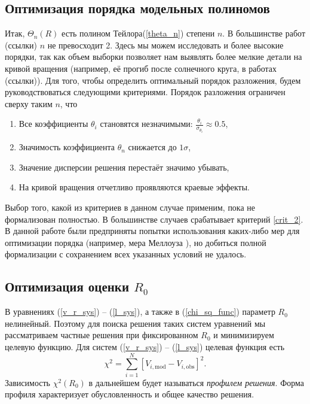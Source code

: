 \documentclass{matmex-diploma-custom}
\begin{document}
\subsection{Оптимизация порядка модельных полиномов}
Итак, $\Theta_n(R)$ есть полином Тейлора(\ref{theta_n}) степени $n$. В большинстве работ (ссылки) $n$ не превосходит 2. Здесь мы можем исследовать и более высокие порядки, так как объем выборки позволяет нам выявлять более мелкие детали на кривой вращения (например, её прогиб после солнечного круга, в работах (ссылки)). Для того, чтобы определить оптимальный порядок разложения, будем руководствоваться следующими критериями.
Порядок разложения ограничен сверху таким $n$, что
\begin{enumerate}
        \item Все коэффициенты $\theta_i$ становятся незначимыми: $\frac{\theta_i}{\sigma_{\theta_i}}\approx 0.5$, \label{crit_1}
        \item Значимость коэффициента $\theta_n$ снижается до $1 \sigma$,  \label{crit_2}
        \item Значение дисперсии решения перестаёт значимо убывать, \label{crit_3}
        \item На кривой вращения отчетливо проявляются краевые эффекты. \label{crit_4}
\end{enumerate}

Выбор того, какой из критериев в данном случае применим, пока не формализован полностью. В большинстве случаев срабатывает критерий \ref{crit_2}. В данной работе были предприняты попытки использования каких-либо мер для оптимизации порядка (например, мера Меллоуза \cite{10}), но добиться полной формализации с сохранением всех указанных условий не удалось.

\subsection{Оптимизация оценки $R_0$}
В уравнениях (\ref{v_r_sys}) -- (\ref{l_sys}), а также в (\ref{chi_sq_func}) параметр $R_0$ нелинейный. Поэтому для поиска решения таких систем уравнений мы рассматриваем частные решения при фиксированном $R_0$ и минимизируем целевую функцию. Для систем (\ref{v_r_sys}) -- (\ref{l_sys}) целевая функция есть
\begin{equation}
        \chi^2 = \sum_{i=1}^{N} \left [ V_{i, \mathrm{mod}} - V_{i, \mathrm{obs}} \right ]^2.
\end{equation}
Зависимость $\chi^2(R_0)$ в дальнейшем будет называться \textit{профилем решения}. Форма профиля характеризует обусловленность и общее качество решения.
\end{document}
